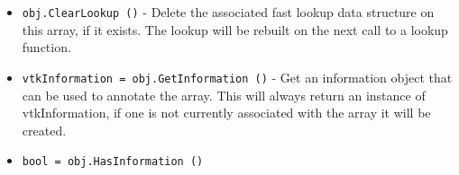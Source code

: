 \begin{itemize}
\item  \verb|obj.ClearLookup ()| -  Delete the associated fast lookup data structure on this array,
 if it exists.  The lookup will be rebuilt on the next call to a lookup
 function.

\item  \verb|vtkInformation = obj.GetInformation ()| -  Get an information object that can be used to annotate the array.
 This will always return an instance of vtkInformation, if one is
 not currently associated with the array it will be created.

\item  \verb|bool = obj.HasInformation ()|

\end{itemize}
